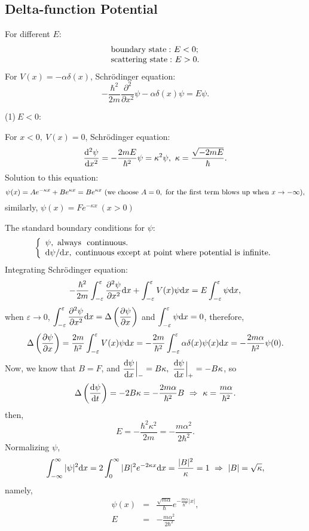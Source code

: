 \documentclass[12pt, 
]{article}
\begin{document}
\subsection{Delta-function Potential}
For different $E$:
\[
	\begin{array}{l}
		{\rm boundary~ state:}~E<0;\\
		{\rm scattering~ state:}~E>0.
	\end{array}
\]
For $V(x)=-\alpha \delta(x)$, Schr\"odinger equation:
\[
	-\frac{\hbar^2}{2m}\frac{\partial^2}{\partial x^2}\psi-\alpha\delta(x)\psi=E\psi.
\]

\noindent (1)$~E<0$:

\noindent For $x<0,~V(x)=0$, Schr\"odinger equation:
\[
	\frac{{\rm d}^2 \psi}{{\rm d}x^2}=-\frac{2mE}{\hbar^2}\psi=\kappa^2\psi,~\kappa=\frac{\sqrt{-2mE}}{\hbar}.
\]
Solution to this equation:
\[
	\psi(x)=Ae^{-\kappa x}+Be^{\kappa x}=Be^{\kappa x}~({\rm we~choose} ~A=0,~{\rm for~the~first~term~blows~up~when}~x\rightarrow -\infty),
\]
similarly, $\psi(x)=Fe^{-\kappa x}~(x>0)$

\noindent The standard boundary conditions for $\psi$:
\[
	\left\{
	\begin{array}{l}
		\psi,~{\rm always~~continuous.}\\
		{\rm d}\psi/{\rm d}x,~{\rm continuous~except~at~point~where~potential~is~infinite.}
	\end{array}
	\right.
\]
Integrating Schr\"odinger equation:
\[
	-\frac{\hbar^2}{2m}\int_{-\varepsilon}^{\varepsilon}\frac{\partial^2\psi}{\partial x^2}{\rm d}x+\int_{-\varepsilon}^{\varepsilon}V(x)\psi{\rm d}x=E\int_{-\varepsilon}^{\varepsilon}\psi{\rm d}x,
\]
when $\varepsilon\rightarrow0$, $\displaystyle\int_{-\varepsilon}^\varepsilon\frac{\partial^2\psi}{\partial x^2}{\rm d}x=\Delta\left(\frac{\partial\psi}{\partial x}\right)$ and $\displaystyle\int_{-\varepsilon}^\varepsilon\psi{\rm d}x=0$,
therefore,
\[
	\Delta\left(\frac{\partial\psi}{\partial x}\right)=\frac{2m}{\hbar^2}\int_{-\varepsilon}^\varepsilon V(x)\psi{\rm d}x=-\frac{2m}{\hbar^2}\int_{-\varepsilon}^\varepsilon\alpha\delta(x)\psi(x){\rm d}x=-\frac{2m\alpha}{\hbar^2}\psi(0).
\]
Now, we know that $B=F$, and $\dfrac{{\rm d}\psi}{{\rm d}x}\Big|_{-}=B\kappa,~\dfrac{{\rm d}\psi}{{\rm d}x}\Big|_+=-B\kappa$, so
\[
	\Delta\left(\frac{{\rm d}\psi}{{\rm d}t}\right)=-2B\kappa=-\frac{2m\alpha}{\hbar^2}B~\Rightarrow~\kappa=\frac{m\alpha}{\hbar^2}.
\]
then,
\[
	E=-\frac{\hbar^2\kappa^2}{2m}=-\frac{m\alpha^2}{2\hbar^2}.
\]
Normalizing $\psi$,
\[
	\int_{-\infty}^\infty|\psi|^2{\rm d}x=2\int_0^\infty|B|^2e^{-2\kappa x}{\rm d}x=\frac{{|B|^2}}{\kappa}=1~\Rightarrow~|B|=\sqrt{\kappa},
\]namely,
\begin{eqnarray*}
	\psi(x)&=&\frac{\sqrt{m\alpha}}{\hbar}e^{-\frac{m\alpha}{\hbar^2}|x|},\\
	E&=&-\frac{m\alpha^2}{2\hbar^2}
\end{eqnarray*}
~\\
\end{document}
